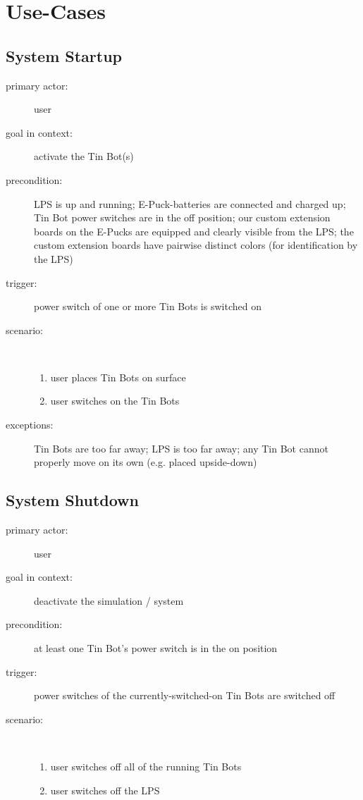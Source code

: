 \documentclass[a4paper,parskip,headheight=38pt]{scrartcl} %
\begin{document}
\section{Use-Cases}
\subsection{System Startup}
\begin{description}
\item[primary actor:] user
\item[goal in context:] activate the Tin Bot(s)
\item[precondition:] LPS is up and running; E-Puck-batteries are connected and charged up;
  Tin Bot power switches are in the off position; our custom extension boards on the
  E-Pucks %
  are equipped and clearly visible from the LPS; the custom extension boards have
  pairwise distinct colors (for identification by the LPS)
\item[trigger:] power switch of one or more Tin Bots is switched on
\item[scenario:] \ 
\begin{enumerate}
	\item user places Tin Bots on surface
	\item user switches on the Tin Bots
\end{enumerate}
\item[exceptions:] Tin Bots are too far away; LPS is too far away; any Tin Bot cannot properly move on its own (e.g. placed upside-down)
\end{description}

\subsection{System Shutdown}
\begin{description}
\item[primary actor:] user
\item[goal in context:] deactivate the simulation / system
\item[precondition:] at least one Tin Bot's power switch is in the on position
\item[trigger:] power switches of the currently-switched-on Tin Bots are switched off
\item[scenario:] \ 
\begin{enumerate}
	\item user switches off all of the running Tin Bots
	\item user switches off the LPS
\end{enumerate}
\end{description}
\end{document}
